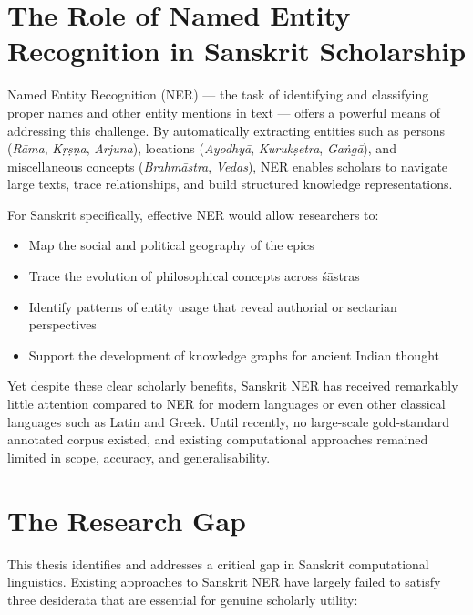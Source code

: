 \section{The Role of Named Entity Recognition in Sanskrit Scholarship}
\label{sec:ner_role}

Named Entity Recognition (NER) — the task of identifying and classifying proper names and other entity mentions in text \cite{nadeau2007ner} — offers a powerful means of addressing this challenge. By automatically extracting entities such as persons (\textit{Rāma}, \textit{Kṛṣṇa}, \textit{Arjuna}), locations (\textit{Ayodhyā}, \textit{Kurukṣetra}, \textit{Gaṅgā}), and miscellaneous concepts (\textit{Brahmāstra}, \textit{Vedas}), NER enables scholars to navigate large texts, trace relationships, and build structured knowledge representations.

For Sanskrit specifically, effective NER would allow researchers to:
\begin{itemize}
    \item Map the social and political geography of the epics
    \item Trace the evolution of philosophical concepts across śāstras
    \item Identify patterns of entity usage that reveal authorial or sectarian perspectives
    \item Support the development of knowledge graphs for ancient Indian thought
\end{itemize}

Yet despite these clear scholarly benefits, Sanskrit NER has received remarkably little attention compared to NER for modern languages or even other classical languages such as Latin and Greek. Until recently, no large-scale gold-standard annotated corpus existed, and existing computational approaches remained limited in scope, accuracy, and generalisability\cite{sarkar2023preannotation}.

\section{The Research Gap}
\label{sec:research_gap_intro}

This thesis identifies and addresses a critical gap in Sanskrit computational linguistics. Existing approaches to Sanskrit NER have largely failed to satisfy three desiderata that are essential for genuine scholarly utility:

